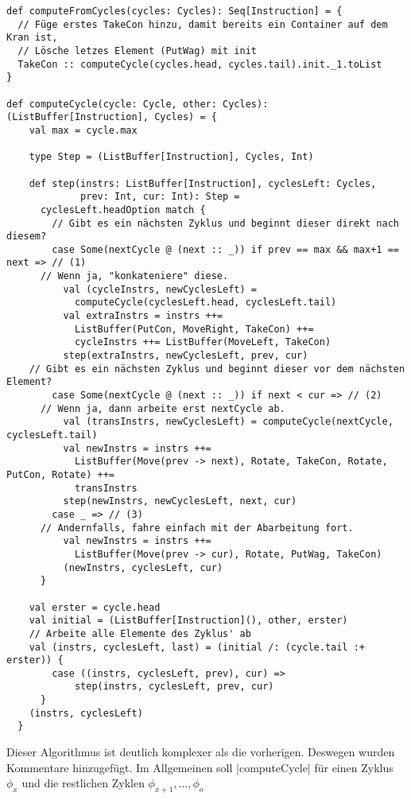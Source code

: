 \lstset{basicstyle=\footnotesize}
\begin{lstlisting}
def computeFromCycles(cycles: Cycles): Seq[Instruction] = {
  // Füge erstes TakeCon hinzu, damit bereits ein Container auf dem Kran ist,
  // Lösche letzes Element (PutWag) mit init
  TakeCon :: computeCycle(cycles.head, cycles.tail).init._1.toList
}

def computeCycle(cycle: Cycle, other: Cycles): (ListBuffer[Instruction], Cycles) = {
    val max = cycle.max

    type Step = (ListBuffer[Instruction], Cycles, Int)

    def step(instrs: ListBuffer[Instruction], cyclesLeft: Cycles,
             prev: Int, cur: Int): Step =
      cyclesLeft.headOption match {
        // Gibt es ein nächsten Zyklus und beginnt dieser direkt nach diesem?
        case Some(nextCycle @ (next :: _)) if prev == max && max+1 == next => // (1)
	  // Wenn ja, "konkateniere" diese.
          val (cycleInstrs, newCyclesLeft) =
            computeCycle(cyclesLeft.head, cyclesLeft.tail)
          val extraInstrs = instrs ++=
            ListBuffer(PutCon, MoveRight, TakeCon) ++=
            cycleInstrs ++= ListBuffer(MoveLeft, TakeCon)
          step(extraInstrs, newCyclesLeft, prev, cur)
	// Gibt es ein nächsten Zyklus und beginnt dieser vor dem nächsten Element?
        case Some(nextCycle @ (next :: _)) if next < cur => // (2)
	  // Wenn ja, dann arbeite erst nextCycle ab.
          val (transInstrs, newCyclesLeft) = computeCycle(nextCycle, cyclesLeft.tail)
          val newInstrs = instrs ++=
            ListBuffer(Move(prev -> next), Rotate, TakeCon, Rotate, PutCon, Rotate) ++=
            transInstrs
          step(newInstrs, newCyclesLeft, next, cur)
        case _ => // (3)
	  // Andernfalls, fahre einfach mit der Abarbeitung fort.
          val newInstrs = instrs ++=
            ListBuffer(Move(prev -> cur), Rotate, PutWag, TakeCon)
          (newInstrs, cyclesLeft, cur)
      }

    val erster = cycle.head
    val initial = (ListBuffer[Instruction](), other, erster)
    // Arbeite alle Elemente des Zyklus' ab
    val (instrs, cyclesLeft, last) = (initial /: (cycle.tail :+ erster)) {
        case ((instrs, cyclesLeft, prev), cur) =>
            step(instrs, cyclesLeft, prev, cur)
      }
    (instrs, cyclesLeft)
  }
\end{lstlisting}
\lstset{basicstyle=\small}
Dieser Algorithmus ist deutlich komplexer als die vorherigen. Deswegen wurden Kommentare hinzugefügt.
Im Allgemeinen soll |computeCycle| für einen Zyklus $\phi_x$ und die restlichen Zyklen $\phi_{x+1}, \dots, \phi_{o}$

